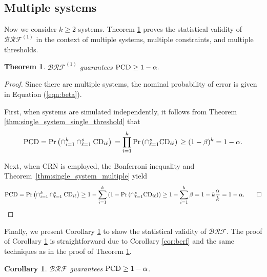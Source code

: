 \documentclass[11pt]{article}
\newtheorem{theorem}{Theorem}
\newtheorem{corollary}{Corollary}
\begin{document}
\subsection{Multiple systems}
\label{subsec:manymany}
Now we consider $k\ge 2$ systems. Theorem \ref{thm:BeRFStatisticalValidityMultiSys} proves the statistical validity of $\mathcal{BRF}^{(1)}$ in the context of multiple systems, multiple constraints, and multiple thresholds.

\begin{theorem}
\label{thm:BeRFStatisticalValidityMultiSys}
    $\mathcal{BRF}^{(1)}$ guarantees ${\rm PCD} \ge 1 - \alpha.$
\end{theorem}
\begin{proof}
\renewcommand{\qedsymbol}{}
Since there are multiple systems, the nominal probability of error is given in Equation (\ref{eqn:beta}).

First, when systems are simulated independently, it follows from Theorem \ref{thm:single_system_single_threshold} that 
\begin{equation*}
{\rm PCD} =\Pr\left(\cap_{i=1}^k \cap_{\ell=1}^s {\rm CD}_{i\ell}\right)\\
= \prod_{i=1}^k \Pr\left(\cap_{\ell=1}^{s} {\rm CD}_{i\ell}\right) \\
\ge  (1 - \beta)^k = 1 - \alpha.
\end{equation*}


Next, when CRN is employed, the Bonferroni inequality and Theorem~\ref{thm:single_system_multiple} yield
\begin{align*}
    {\rm PCD} =\Pr\left(\cap_{i=1}^k \cap_{\ell=1}^s {\rm CD}_{i\ell}\right)\ge 1 - \sum_{i=1}^k \left( 1 - \Pr\left(\cap_{\ell=1}^{s} {\rm CD}_{i\ell}\right) \right)\ge 1 - \sum_{i=1}^k \beta = 1- k {\alpha \over k} = 1 - \alpha.
\tag*{$\square$}
\end{align*}
\end{proof}
\vspace{-0.8cm}

Finally, we present Corollary \ref{cor:berf_multisys} to show the statistical validity of $\mathcal{BRF}$. The proof of Corollary \ref{cor:berf_multisys} is straightforward due to Corollary \ref{cor:berf} and the same techniques as in the proof of Theorem \ref{thm:BeRFStatisticalValidityMultiSys}.
\begin{corollary}
\label{cor:berf_multisys}
    $\mathcal{BRF}$ guarantees ${\rm PCD}\geq 1-\alpha$.
\end{corollary}
\end{document}
